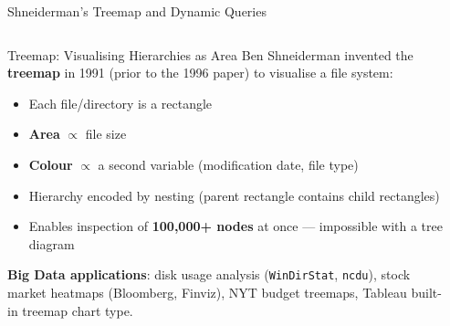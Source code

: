 \documentclass[aspectratio=169,10pt]{beamer}
\begin{document}
\begin{frame}{Shneiderman's Treemap and Dynamic Queries}
  \begin{columns}[T]
      \begin{block}{Treemap: Visualising Hierarchies as Area}
        Ben Shneiderman invented the \textbf{treemap} in 1991
        (prior to the 1996 paper) to visualise a file system:
        \begin{itemize}
          \item Each file/directory is a rectangle
          \item \textbf{Area} $\propto$ file size
          \item \textbf{Colour} $\propto$ a second variable
                (modification date, file type)
          \item Hierarchy encoded by nesting (parent rectangle
                contains child rectangles)
          \item Enables inspection of \textbf{100{,}000+ nodes}
                at once — impossible with a tree diagram
        \end{itemize}
        \textbf{Big Data applications}:
        disk usage analysis (\texttt{WinDirStat}, \texttt{ncdu}),
        stock market heatmaps (Bloomberg, Finviz),
        NYT budget treemaps,
        Tableau built-in treemap chart type.
      \end{block}

      \begin{center}
\end{center}
\end{columns}
\end{frame}
\end{document}
